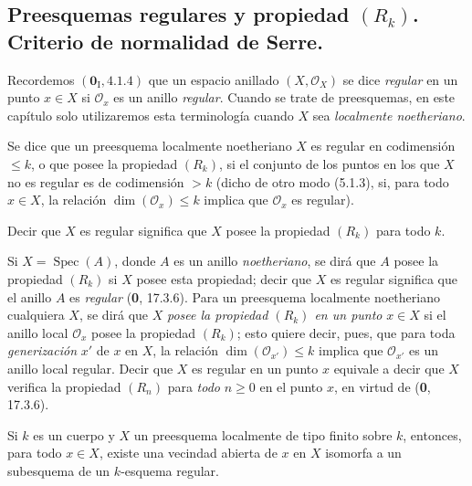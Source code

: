 \subsection{\texorpdfstring{Preesquemas regulares y propiedad $(R_k)$. Criterio de normalidad de Serre.}{Preesquemas regulares y propiedad (R\string_k). Criterio de normalidad de Serre}}

\begin{env}[5.8.1]
\label{IV.2.s5.8.1-fr}
Recordemos $(\mathbf{0}_{\mathrm I},4.1.4)$ que un espacio anillado
$(X,\mathcal O_X)$ se dice \emph{regular} en un punto $x\in X$ si
$\mathcal O_x$ es un anillo \emph{regular}. Cuando se trate de preesquemas, en este
capítulo solo utilizaremos esta terminología cuando $X$ sea \emph{localmente
noetheriano}.
\end{env}

\begin{definition}[5.8.2]
\label{IV.2.s5.8.2-fr}
Se dice que un preesquema localmente noetheriano $X$ es \textup{regular en codimensión
$\leq k$}, o que \textup{posee la propiedad $(R_k)$}, si el conjunto de los puntos en
los que $X$ no es regular es de codimensión $>k$ \textup{(dicho de otro modo (5.1.3),}
si, para todo $x\in X$, la relación $\dim(\mathcal O_x)\leq k$ implica que
$\mathcal O_x$ es regular).
\end{definition}

Decir que $X$ es regular significa que $X$ posee la propiedad $(R_k)$ para
todo $k$.

Si $X=\operatorname{Spec}(A)$, donde $A$ es un anillo \emph{noetheriano}, se dirá
que $A$ posee la propiedad $(R_k)$ si $X$ posee esta propiedad; decir que $X$
es regular significa que el anillo $A$ es \emph{regular} (\textbf 0, 17.3.6). Para un
preesquema localmente noetheriano cualquiera $X$, se dirá que $X$ \emph{posee la
propiedad $(R_k)$ en un punto} $x\in X$ si el anillo local $\mathcal O_x$
posee la propiedad $(R_k)$; esto quiere decir, pues, que para toda
\emph{generización} $x'$ de $x$ en $X$, la relación
$\dim(\mathcal O_{x'})\leq k$ implica que $\mathcal O_{x'}$ es un anillo local
regular. Decir que $X$ es regular en un punto $x$ equivale a decir que $X$
verifica la propiedad $(R_n)$ para \emph{todo} $n\geq0$ en el punto $x$, en virtud
de (\textbf 0, 17.3.6).

\begin{proposition}[5.8.3]
\label{IV.2.s5.8.3-fr}
Si $k$ es un cuerpo y $X$ un preesquema localmente de tipo finito sobre $k$,
entonces, para todo $x\in X$, existe una vecindad abierta de $x$ en $X$
isomorfa a un subesquema de un $k$-esquema regular.
\end{proposition}

